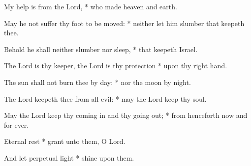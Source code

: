 \item My help is from the Lord, * who made heaven and earth.
\item May he not suffer thy foot to be moved: * neither let him slumber that keepeth thee.
\item Behold he shall neither slumber nor sleep, * that keepeth Israel.
\item The Lord is thy keeper, the Lord is thy protection * upon thy right hand.
\item The sun shall not burn thee by day: * nor the moon by night.
\item The Lord keepeth thee from all evil: * may the Lord keep thy soul.
\item May the Lord keep thy coming in and thy going out; * from henceforth now and for ever.
\item Eternal rest * grant unto them, O Lord.
\item And let perpetual light * shine upon them.
